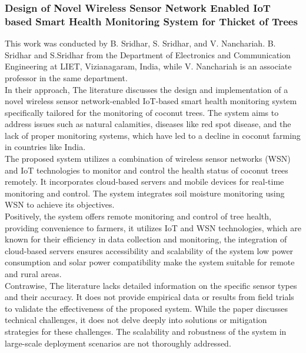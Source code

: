 \documentclass[12pt, a4paper]{article}
\begin{document}
\subsubsection{Design of Novel Wireless Sensor Network Enabled IoT based Smart Health Monitoring System for Thicket of Trees}
This work was conducted by B. Sridhar, S. Sridhar, and V. Nanchariah. B. Sridhar and S.Sridhar \cite{sridhar2020design} from the Department of Electronics and Communication Engineering at LIET, Vizianagaram, India, while V. Nanchariah is an associate professor in the same department.\\
In their approach, The literature discusses the design and implementation of a novel wireless sensor network-enabled IoT-based smart health monitoring system specifically tailored for the monitoring of
coconut trees. The system aims to address issues such as natural calamities, diseases like red spot
disease, and the lack of proper monitoring systems, which have led to a decline in coconut farming in countries like India.\\
The proposed system utilizes a combination of wireless sensor networks (WSN) and IoT technologies to monitor and control the health status of coconut trees remotely. It incorporates cloud-based servers and mobile devices for real-time monitoring and control. The system integrates soil moisture monitoring using WSN to achieve its objectives.\\
Positively, the system offers remote monitoring and control of tree health, providing convenience to
farmers, it utilizes IoT and WSN technologies, which are known for their efficiency in data
collection and monitoring, the integration of cloud-based servers ensures accessibility and scalability of the system low power consumption and solar power compatibility make the system suitable for remote and rural areas.\\
Contrawise, The literature lacks detailed information on the specific sensor types and their accuracy.
It does not provide empirical data or results from field trials to validate the effectiveness of the proposed system. While the paper discusses technical challenges, it does not delve deeply into solutions or mitigation strategies for these challenges. The scalability and robustness of the system in large-scale deployment scenarios are not thoroughly addressed. 
\end{document}
